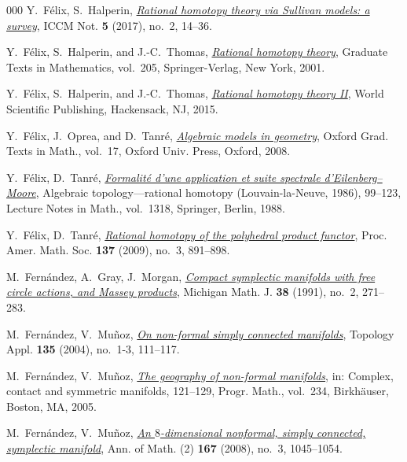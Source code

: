 \documentclass{article}
\numberwithin{equation}{section}
\theoremstyle{definition}
\begin{document}
\begin{thebibliography}{000}
 Y.~F{\'e}lix, S.~Halperin, 
\href{https://dx.doi.org/10.4310/ICCM.2017.v5.n2.a3}%
{\em Rational homotopy theory via Sullivan models: a survey},
ICCM Not. \textbf{5} (2017), no.~2, 14--36. 

 Y.~F{\'e}lix, S.~Halperin, and J.-C.~Thomas,
\href{https://dx.doi.org/10.1007/978-1-4613-0105-9}%
{\emph{Rational homotopy theory}}, Graduate Texts in Mathematics, 
vol.~205, Springer-Verlag, New York, 2001. 
  
 Y.~F{\'e}lix, S.~Halperin, and J.-C.~Thomas,
\href{https://dx.doi.org/10.1142/9473}%
{\emph{Rational homotopy theory \textup{II}}},  
World Scientific Publishing, Hackensack, NJ, 2015.

 Y.~F\'{e}lix, J.~Oprea, and D.~Tanr\'{e}, 
\href{https://global.oup.com/academic/product/algebraic-models-in-geometry-9780199206520}%
{\em Algebraic models in geometry}, Oxford Grad. Texts in Math., 
vol.~17, Oxford Univ. Press, Oxford, 2008. 

 Y.~F\'{e}lix, D.~Tanr\'{e}, 
\href{https://doi.org/10.1007/BFb0077798}%
{\em Formalit\'{e} d'une application et suite spectrale d'Eilenberg--Moore}, 
Algebraic topology—rational homotopy (Louvain-la-Neuve, 1986), 99--123, 
Lecture Notes in Math., vol.~1318, Springer, Berlin, 1988. 

 Y.~F\'{e}lix, D.~Tanr\'{e}, 
\href{https://doi.org/10.1090/S0002-9939-08-09591-9}%
{\em Rational homotopy of the polyhedral product functor}, 
Proc. Amer. Math. Soc. \textbf{137} (2009), no.~3, 891--898.

 M.~Fern\'{a}ndez, A.~Gray, J.~Morgan, 
\href{https://doi.org/10.1307/mmj/1029004333}%
{\em Compact symplectic manifolds with free circle actions, 
and {M}assey products}, Michigan Math. J. \textbf{38} (1991), 
no.~2, 271--283. 

 M.~Fern\'andez, V.~Mu\~noz,
\href{https://doi.org/10.1016/S0166-8641(03)00158-5}%
{\em On non-formal simply connected manifolds}, 
Topology Appl. \textbf{135} (2004), no.~1-3, 111--117.

 M.~Fern\'{a}ndez, V.~Mu\~{n}oz,
\href{https://doi.org/10.1007/0-8176-4424-5_8}%
{\em The geography of non-formal manifolds}, in:
Complex, contact and symmetric manifolds, 121--129,
Progr. Math., vol.~234, Birkh\"{a}user, Boston, MA, 2005.

 M.~Fern\'{a}ndez, V.~Mu\~{n}oz,
\href{https://doi.org/10.4007/annals.2008.167.1045}%
{\em An $8$-dimensional nonformal, simply connected, 
symplectic manifold}, Ann. of Math. (2) \textbf{167} (2008), 
no.~3, 1045--1054. 


\end{thebibliography}
\end{document}
